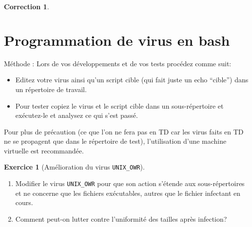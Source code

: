 \documentclass[a4paper,11pt]{article}
\theoremstyle{plain}
\newtheorem{correction}{Correction}
\theoremstyle{definition}
\newtheorem{exercice}{Exercice}
\begin{document}
\begin{correction}
\end{correction}



\section{Programmation de virus en bash}

{\Large Méthode :} Lors de vos développements et de vos tests procédez comme suit:
\begin{itemize}
\item Editez votre virus ainsi qu'un script cible (qui fait juste un echo ``cible'') dans un répertoire de travail.
\item Pour tester copiez le virus et le script cible dans un sous-répertoire et exécutez-le et analysez ce qui s'est passé.
\end{itemize}
Pour plus de précaution (ce que l'on ne fera pas en TD car les virus faits en TD ne se propagent que dans le répertoire de test), l'utilisation d'une machine virtuelle est recommandée.



\begin{exercice}[Amélioration du virus \texttt{UNIX\_OWR}]$\;$

\begin{enumerate}
\item Modifier le virus \texttt{UNIX\_OWR} pour que son action s'étende aux sous-répertoires et ne concerne que les fichiers exécutables, autres que le fichier infectant en cours.
\item Comment peut-on lutter contre l'uniformité des tailles après infection?
\end{enumerate}
\end{exercice}
\end{document}
